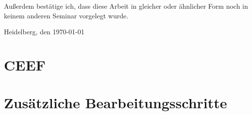 \documentclass[
     11pt,         %
     a4paper,      %
     oneside,
     ]{article}
\theoremstyle{custm}
\begin{document}
Außerdem bestätige ich, dass diese Arbeit in gleicher oder ähnlicher Form noch in keinem anderen Seminar vorgelegt wurde.
\vspace*{50pt}

Heidelberg, den \today \hspace{2cm} \underline{\phantom{Platz für die Unterschrift}}
\newpage



\tableofcontents
\newpage








\section{CEEF}










\section{Zusätzliche Bearbeitungsschritte}










\newpage

\end{document}
